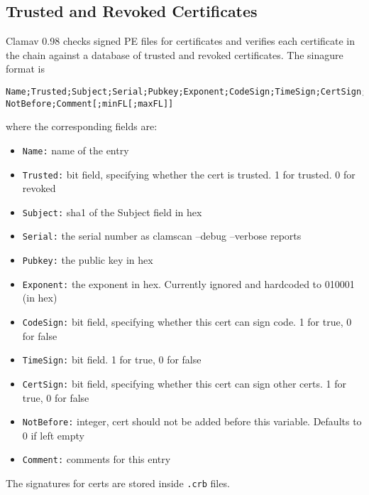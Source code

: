 \documentclass[a4paper,titlepage,12pt]{article}
\begin{document}
    \subsection{Trusted and Revoked Certificates}
    Clamav 0.98 checks signed PE files for certificates and verifies each
    certificate in the chain against a database of trusted and revoked
    certificates. The sinagure format is
\begin{verbatim}
Name;Trusted;Subject;Serial;Pubkey;Exponent;CodeSign;TimeSign;CertSign;
NotBefore;Comment[;minFL[;maxFL]]
\end{verbatim}
    where the corresponding fields are:
    \begin{itemize}
        \item \verb+Name:+ name of the entry
        \item \verb+Trusted:+ bit field, specifying whether the cert is
            trusted. 1 for trusted. 0 for revoked
        \item \verb+Subject:+ sha1 of the Subject field in hex
        \item \verb+Serial:+ the serial number as clamscan --debug --verbose
            reports
        \item \verb+Pubkey:+ the public key in hex
        \item \verb+Exponent:+ the exponent in hex. Currently ignored and
            hardcoded to 010001 (in hex)
        \item \verb+CodeSign:+ bit field, specifying whether this cert
            can sign code. 1 for true, 0 for false
        \item \verb+TimeSign:+ bit field. 1 for true, 0 for false
        \item \verb+CertSign:+ bit field, specifying whether this cert
            can sign other certs. 1 for true, 0 for false
        \item \verb+NotBefore:+ integer, cert should not be added before
            this variable. Defaults to 0 if left empty
        \item \verb+Comment:+ comments for this entry
    \end{itemize}
    The signatures for certs are stored inside \verb+.crb+ files.
\end{document}
